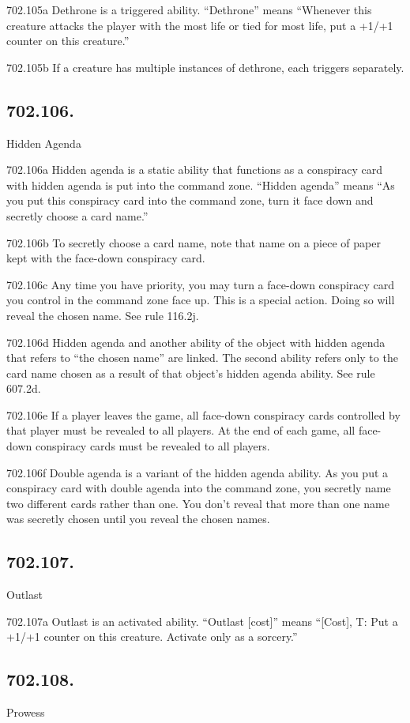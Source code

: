702.105a Dethrone is a triggered ability. “Dethrone” means “Whenever this creature attacks the player with the most life or tied for most life, put a +1/+1 counter on this creature.”

702.105b If a creature has multiple instances of dethrone, each triggers separately.

\subsection*{702.106.}
Hidden Agenda

702.106a Hidden agenda is a static ability that functions as a conspiracy card with hidden agenda is put into the command zone. “Hidden agenda” means “As you put this conspiracy card into the command zone, turn it face down and secretly choose a card name.”

702.106b To secretly choose a card name, note that name on a piece of paper kept with the face-down conspiracy card.

702.106c Any time you have priority, you may turn a face-down conspiracy card you control in the command zone face up. This is a special action. Doing so will reveal the chosen name. See rule 116.2j.

702.106d Hidden agenda and another ability of the object with hidden agenda that refers to “the chosen name” are linked. The second ability refers only to the card name chosen as a result of that object’s hidden agenda ability. See rule 607.2d.

702.106e If a player leaves the game, all face-down conspiracy cards controlled by that player must be revealed to all players. At the end of each game, all face-down conspiracy cards must be revealed to all players.

702.106f Double agenda is a variant of the hidden agenda ability. As you put a conspiracy card with double agenda into the command zone, you secretly name two different cards rather than one. You don’t reveal that more than one name was secretly chosen until you reveal the chosen names.

\subsection*{702.107.}
Outlast

702.107a Outlast is an activated ability. “Outlast [cost]” means “[Cost], {T}: Put a +1/+1 counter on this creature. Activate only as a sorcery.”

\subsection*{702.108.}
Prowess

